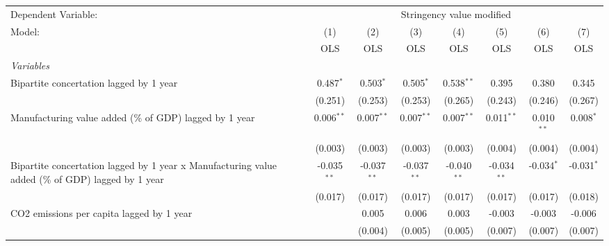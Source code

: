 
\begingroup
\centering
\begin{tabular}{lccccccc}
   \toprule
   Dependent Variable: & \multicolumn{7}{c}{Stringency value modified}\\
   Model:                                                                                            & (1)           & (2)           & (3)           & (4)           & (5)           & (6)          & (7)\\  
                                                                                                     &  OLS          & OLS           & OLS           & OLS           & OLS           & OLS          & OLS\\  
   \midrule
   \emph{Variables}\\
   Bipartite concertation lagged by 1 year                                                           & 0.487$^{*}$   & 0.503$^{*}$   & 0.505$^{*}$   & 0.538$^{**}$  & 0.395         & 0.380        & 0.345\\   
                                                                                                     & (0.251)       & (0.253)       & (0.253)       & (0.265)       & (0.243)       & (0.246)      & (0.267)\\   
   Manufacturing value added (\% of GDP) lagged by 1 year                                            & 0.006$^{**}$  & 0.007$^{**}$  & 0.007$^{**}$  & 0.007$^{**}$  & 0.011$^{**}$  & 0.010$^{**}$ & 0.008$^{*}$\\   
                                                                                                     & (0.003)       & (0.003)       & (0.003)       & (0.003)       & (0.004)       & (0.004)      & (0.004)\\   
   Bipartite concertation lagged by 1 year x Manufacturing value added (\% of GDP) lagged by 1 year  & -0.035$^{**}$ & -0.037$^{**}$ & -0.037$^{**}$ & -0.040$^{**}$ & -0.034$^{**}$ & -0.034$^{*}$ & -0.031$^{*}$\\   
                                                                                                     & (0.017)       & (0.017)       & (0.017)       & (0.017)       & (0.017)       & (0.017)      & (0.018)\\   
   CO2 emissions per capita lagged by 1 year                                                         &               & 0.005         & 0.006         & 0.003         & -0.003        & -0.003       & -0.006\\   
                                                                                                     &               & (0.004)       & (0.005)       & (0.005)       & (0.007)       & (0.007)      & (0.007)\\   

\end{tabular}
